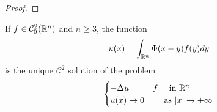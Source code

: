 \begin{ProofBox}
    \begin{proof}
        
    \end{proof}
\end{ProofBox}
\begin{PropBox}
    \begin{Cor}
        If $f \in \mathcal{C}^2_0(\mathbb{R}^n)$ and $n \geq 3$, the function 
        \begin{equation*}
            u(x) = \int_{\mathbb{R}^n} \Phi(x-y) f(y) dy
        \end{equation*}
        is the unique $\mathcal{C}^2$ solution of the problem
        \begin{equation*}
            \begin{cases}
                -\Delta u & f \quad \text{ in } \mathbb{R}^n\\
                u(x) \rightarrow 0 & \quad \text{ as } |x| \rightarrow +\infty
            \end{cases}
        \end{equation*}
    \end{Cor}
\end{PropBox}